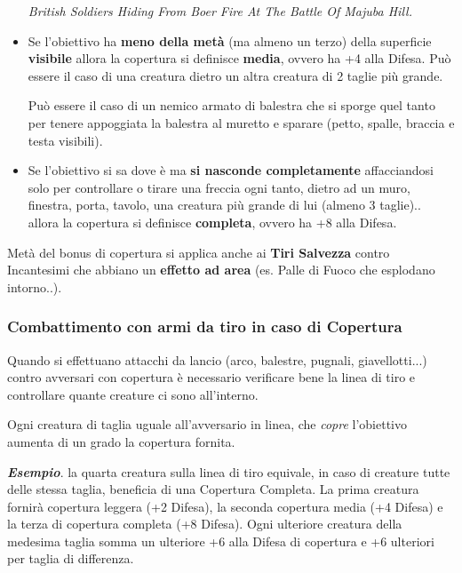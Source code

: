 \begin{multicols}{2}
\begin{itemize}[leftmargin=*]
\begin{center}
\emph{British Soldiers Hiding From Boer Fire At The Battle Of Majuba Hill.}
\end{center}

\item
Se l'obiettivo ha \textbf{meno della metà} (ma almeno un terzo) della superficie \textbf{visibile} allora la copertura si definisce \textbf{media}, ovvero ha +4 alla Difesa. Può essere il caso di una creatura dietro un altra creatura di 2 taglie più grande.

Può essere il caso di un nemico armato di balestra che si sporge quel tanto per tenere appoggiata la balestra al muretto e sparare (petto, spalle, braccia e testa visibili).

\item
Se l'obiettivo si sa dove è ma \textbf{si nasconde completamente} affacciandosi solo per controllare o tirare una freccia ogni tanto, dietro ad un muro, finestra, porta, tavolo, una creatura più grande di lui (almeno 3 taglie).. allora la copertura si definisce \textbf{completa}, ovvero ha +8 alla Difesa.

\end{itemize}

Metà del bonus di copertura si applica anche ai \textbf{Tiri Salvezza} contro Incantesimi che abbiano un \textbf{effetto ad area} (es. Palle di Fuoco che esplodano intorno..).

\subsubsection{Combattimento con armi da tiro in caso di Copertura}\label{esempicopertura}\hypertarget{esempicopertura}{}

Quando si effettuano attacchi da lancio (arco, balestre, pugnali, giavellotti...) contro avversari con copertura è necessario verificare bene la linea di tiro e controllare quante creature ci sono all'interno.

Ogni creatura di taglia uguale all'avversario in linea, che \emph{copre} l'obiettivo aumenta di un grado la copertura fornita.

\textbf{\textit{Esempio}}. la quarta creatura sulla linea di tiro equivale, in caso di creature tutte delle stessa taglia, beneficia di una Copertura Completa. La prima creatura fornirà copertura leggera (+2 Difesa), la seconda copertura media (+4 Difesa) e la terza di copertura completa (+8 Difesa). Ogni ulteriore creatura della medesima taglia somma un ulteriore +6 alla Difesa di copertura e +6 ulteriori per taglia di differenza.


\end{multicols}
